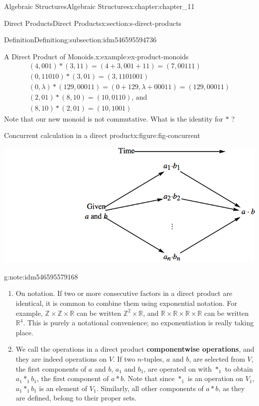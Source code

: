 \documentclass[oneside,10pt,]{book}
\newcommand{\terminology}[1]{\textbf{#1}}
\numberwithin{equation}{section}
\begin{document}
\begin{chapterptx}{Algebraic Structures}{}{Algebraic Structures}{}{}{x:chapter:chapter_11}
\begin{sectionptx}{Direct Products}{}{Direct Products}{}{}{x:section:s-direct-products}
\begin{subsectionptx}{Definition}{}{Definition}{}{}{g:subsection:idm546595594736}
\begin{example}{A Direct Product of Monoids.}{x:example:ex-product-monoids}
\begin{equation*}
\begin{array}{c}
(4, 001) * (3, 11) = (4 + 3, 001+11) = (7, 00111)\\
(0, 11010) * (3,01) = (3, 1101001)\\
(0, \lambda ) * (129, 00011) = (0 + 129, \lambda +00011) = (129, 00011)\\
(2, 01) * (8, 10) = (10,0110)\textrm{, and }\\
(8, 10) * (2, 01) = (10, 1001)
\end{array}
\end{equation*}
Note that our new monoid is not commutative. What is the identity for \(*\) ?%
\end{example}
\begin{figureptx}{Concurrent calculation in a direct product}{x:figure:fig-concurrent}{}%
\begin{image}{0.15}{0.7}{0.15}%
\includegraphics[width=\linewidth]{images/fig-concurrent.png}
\end{image}%
\tcblower
\end{figureptx}%
\begin{note}{}{g:note:idm546595579168}%
%
\begin{enumerate}[label=(\alph*)]
\item{}On notation. If two or more consecutive factors in a direct product are identical, it is common to combine them using exponential notation. For example, \(\mathbb{Z} \times  \mathbb{Z} \times  \mathbb{R}\) can be written \(\mathbb{Z}^2 \times  \mathbb{R}\), and \(\mathbb{R} \times  \mathbb{R}
\times  \mathbb{R} \times  \mathbb{R}\) can be written \(\mathbb{R}^4\). This is purely a notational convenience; no exponentiation is really taking place.%
\item{}We call the operations in a direct product \terminology{componentwise operations}, and they are indeed operations on \(V\).  If two \(n\)-tuples, \(a\) and \(b\), are selected from \(V\), the first components of \(a\) and \(b\), \(a_1\) and \(b_1\), are operated on with \(*_1\) to obtain \(a_1*_1b_1\), the first component of \(a * b\). Note that since \(*_1\) is an operation on \(V_1\), \(a_1*_1b_1\) is an element of \(V_1\). Similarly, all other components of \(a * b\), as they are defined, belong to their proper sets.%

\end{enumerate}
\end{note}
\end{subsectionptx}
\end{sectionptx}
\end{chapterptx}
\end{document}
